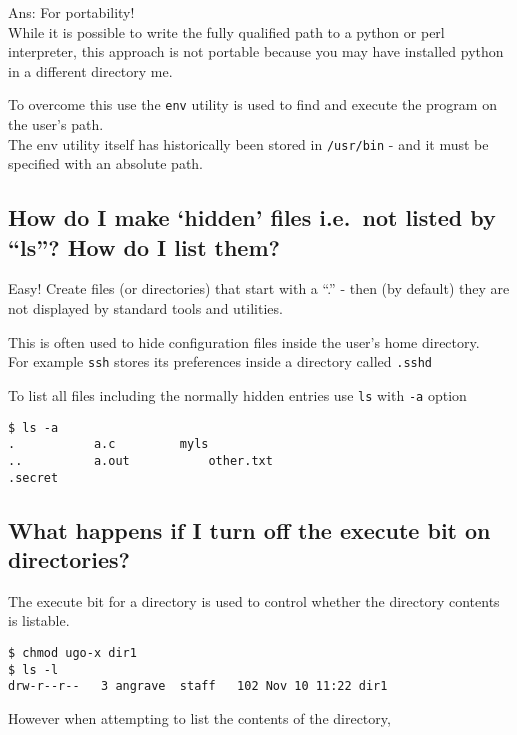 Ans: For portability!\\While it is possible to write the fully qualified
path to a python or perl interpreter, this approach is not portable
because you may have installed python in a different directory me.

To overcome this use the \texttt{env} utility is used to find and
execute the program on the user's path.\\The env utility itself has
historically been stored in \texttt{/usr/bin} - and it must be specified
with an absolute path.

\subsection{\texorpdfstring{How do I make `hidden' files i.e.~not listed
by ``ls''? How do I list
them?}{How do I make hidden files i.e.~not listed by ls? How do I list them?}}\label{how-do-i-make-hidden-files-i.e.not-listed-by-ls-how-do-i-list-them}

Easy! Create files (or directories) that start with a ``.'' - then (by
default) they are not displayed by standard tools and utilities.

This is often used to hide configuration files inside the user's home
directory.\\For example \texttt{ssh} stores its preferences inside a
directory called \texttt{.sshd}

To list all files including the normally hidden entries use \texttt{ls}
with \texttt{-a} option

\begin{verbatim}
$ ls -a
.           a.c         myls
..          a.out           other.txt
.secret 
\end{verbatim}

\subsection{What happens if I turn off the execute bit on
directories?}\label{what-happens-if-i-turn-off-the-execute-bit-on-directories}

The execute bit for a directory is used to control whether the directory
contents is listable.

\begin{verbatim}
$ chmod ugo-x dir1
$ ls -l
drw-r--r--   3 angrave  staff   102 Nov 10 11:22 dir1
\end{verbatim}

However when attempting to list the contents of the directory,

